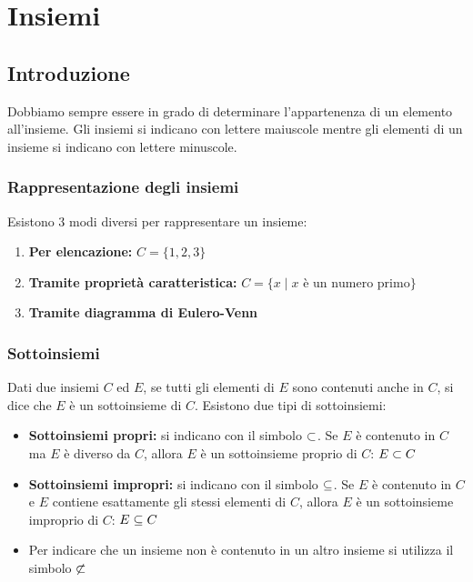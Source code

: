 \chapter{Insiemi}

\section{Introduzione}


Dobbiamo sempre essere in grado di determinare l'appartenenza di un elemento all'insieme.
Gli insiemi si indicano con lettere maiuscole mentre gli elementi di un insieme si indicano con lettere minuscole.


\subsection{Rappresentazione degli insiemi}
Esistono 3 modi diversi per rappresentare un insieme:
\begin{enumerate}
    \item \textbf{Per elencazione:} $C = \{1, 2, 3\}$
    \item \textbf{Tramite proprietà caratteristica:} $C = \{x \mid x \text{ è un numero primo}\}$
    \item \textbf{Tramite diagramma di Eulero-Venn}
\end{enumerate}


\subsection{Sottoinsiemi}
Dati due insiemi $C$ ed $E$, se tutti gli elementi di $E$ sono contenuti anche in $C$, si dice che $E$ è un sottoinsieme di $C$.
Esistono due tipi di sottoinsiemi:
\begin{itemize}
    \item \textbf{Sottoinsiemi propri:} si indicano con il simbolo $\subset$. Se $E$ è contenuto in $C$ ma $E$ è diverso da $C$, allora $E$ è un sottoinsieme proprio di $C$: $E \subset C$
    \item \textbf{Sottoinsiemi impropri:} si indicano con il simbolo $\subseteq$. Se $E$ è contenuto in $C$ e $E$ contiene esattamente gli stessi elementi di $C$, allora $E$ è un sottoinsieme improprio di $C$: $E \subseteq C$
    \item Per indicare che un insieme non è contenuto in un altro insieme si utilizza il simbolo $\not\subset$
\end{itemize}

